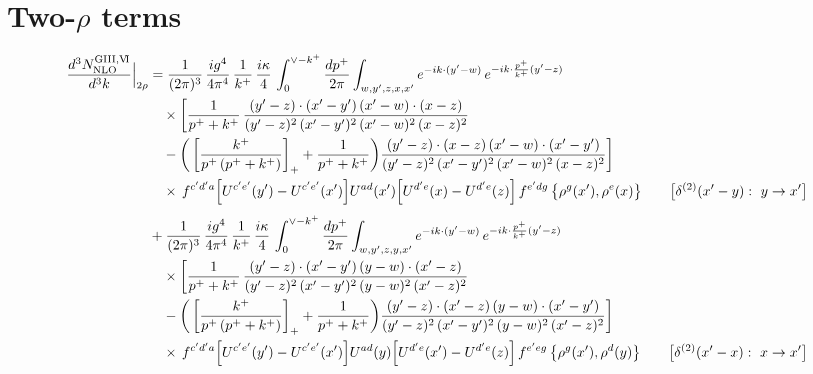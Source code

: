 \documentclass[9pt]{article}
\numberwithin{equation}{section}
\begin{document}
\section{Two-$\rho$ terms}
\begin{align}
\frac{d^{3}N^{\rm GIII,V\!I}_{\rm NLO}}{d^{3}k}\Big|_{2\rho}&=\frac{1}{(2\pi)^{3}}\,\frac{ig^{4}}{4\pi^{4}}\,\frac{1}{k^{+}}\,\frac{i\kappa}{4}\,\int_{0}^{\vee-k^{+}}\frac{dp^{+}}{2\pi}\int_{w,y^{\prime},z,x,x^{\prime}}e^{-ik\cdot(y^{\prime}-w)}\,e^{-ik\cdot\frac{p^{+}}{k^{+}}(y^{\prime}-z)}\notag\\&\quad\times\bigg[\frac{1}{p^{+}+k^{+}}\,\frac{(y^{\prime}-z)\cdot(x^{\prime}-y^{\prime})\,(x^{\prime}-w)\cdot(x-z)}{(y^{\prime}-z)^{2}\,(x^{\prime}-y^{\prime})^{2}\,(x^{\prime}-w)^{2}\,(x-z)^{2}}\notag\\
&\quad -\bigg(\left[\frac{k^{+}}{p^{+}\,(p^{+}+k^{+})}\right]_{+}+\frac{1}{p^{+}+k^{+}}\bigg)\frac{(y^{\prime}-z)\cdot(x-z)\,(x^{\prime}-w)\cdot(x^{\prime}-y^{\prime})}{(y^{\prime}-z)^{2}\,(x^{\prime}-y^{\prime})^{2}\,(x^{\prime}-w)^{2}\,(x-z)^{2}}\bigg]\notag\\&\quad\times\,f^{c^{\prime}d^{\prime}a}\Big[U^{c^{\prime}e^{\prime}}(y^{\prime})-U^{c^{\prime}e^{\prime}}(x^{\prime})\Big]U^{ad}(x^{\prime})\Big[U^{d^{\prime}e}(x)-U^{d^{\prime}e}(z)\Big]\,f^{e^{\prime}dg}\,\big\{\rho^{g}(x^{\prime}),\rho^{e}(x)\big\}\qquad\big[\delta^{(2)}(x^{\prime}-y):\ y\to x^{\prime}\big]\notag\\[4pt]
&+\frac{1}{(2\pi)^{3}}\,\frac{ig^{4}}{4\pi^{4}}\,\frac{1}{k^{+}}\,\frac{i\kappa}{4}\,\int_{0}^{\vee-k^{+}}\frac{dp^{+}}{2\pi}\int_{w,y^{\prime},z,y,x^{\prime}}e^{-ik\cdot(y^{\prime}-w)}\,e^{-ik\cdot\frac{p^{+}}{k^{+}}(y^{\prime}-z)}\notag\\&\quad\times\bigg[\frac{1}{p^{+}+k^{+}}\,\frac{(y^{\prime}-z)\cdot(x^{\prime}-y^{\prime})\,(y-w)\cdot(x^{\prime}-z)}{(y^{\prime}-z)^{2}\,(x^{\prime}-y^{\prime})^{2}\,(y-w)^{2}\,(x^{\prime}-z)^{2}}\notag\\
&\quad -\bigg(\left[\frac{k^{+}}{p^{+}\,(p^{+}+k^{+})}\right]_{+}+\frac{1}{p^{+}+k^{+}}\bigg)\frac{(y^{\prime}-z)\cdot(x^{\prime}-z)\,(y-w)\cdot(x^{\prime}-y^{\prime})}{(y^{\prime}-z)^{2}\,(x^{\prime}-y^{\prime})^{2}\,(y-w)^{2}\,(x^{\prime}-z)^{2}}\bigg]\notag\\&\quad\times\,f^{c^{\prime}d^{\prime}a}\Big[U^{c^{\prime}e^{\prime}}(y^{\prime})-U^{c^{\prime}e^{\prime}}(x^{\prime})\Big]U^{ad}(y)\Big[U^{d^{\prime}e}(x^{\prime})-U^{d^{\prime}e}(z)\Big]\,f^{e^{\prime}eg}\,\big\{\rho^{g}(x^{\prime}),\rho^{d}(y)\big\}\qquad\big[\delta^{(2)}(x^{\prime}-x):\ x\to x^{\prime}\big]\notag\\[4pt]

\end{align}
\end{document}
